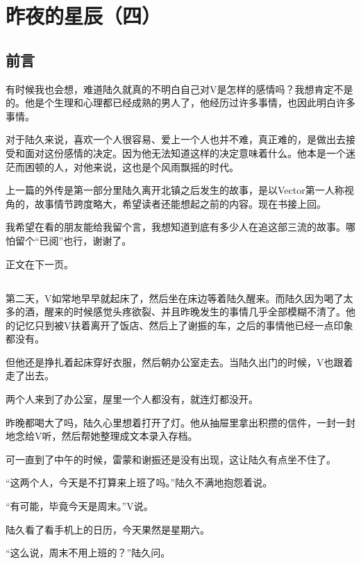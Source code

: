 \chapter{昨夜的星辰（四）}


\section*{前言}
有时候我也会想，难道陆久就真的不明白自己对V是怎样的感情吗？我想肯定不是的。他是个生理和心理都已经成熟的男人了，他经历过许多事情，也因此明白许多事情。

对于陆久来说，喜欢一个人很容易、爱上一个人也并不难，真正难的，是做出去接受和面对这份感情的决定。因为他无法知道这样的决定意味着什么。他本是一个迷茫而困顿的人，对他来说，这也是个风雨飘摇的时代。

\lineseparator

上一篇的外传是第一部分里陆久离开北镇之后发生的故事，是以Vector第一人称视角的，故事情节跨度略大，希望读者还能想起之前的内容。现在书接上回。

我希望在看的朋友能给我留个言，我想知道到底有多少人在追这部三流的故事。哪怕留个“已阅”也行，谢谢了。

正文在下一页。

\lineseparator

\section*{}

第二天，V如常地早早就起床了，然后坐在床边等着陆久醒来。而陆久因为喝了太多的酒，醒来的时候感觉头疼欲裂、并且昨晚发生的事情几乎全部模糊不清了。他的记忆只到被V扶着离开了饭店、然后上了谢振的车，之后的事情他已经一点印象都没有。

但他还是挣扎着起床穿好衣服，然后朝办公室走去。当陆久出门的时候，V也跟着走了出去。

两个人来到了办公室，屋里一个人都没有，就连灯都没开。

昨晚都喝大了吗，陆久心里想着打开了灯。他从抽屉里拿出积攒的信件，一封一封地念给V听，然后帮她整理成文本录入存档。

可一直到了中午的时候，雷蒙和谢振还是没有出现，这让陆久有点坐不住了。

“这两个人，今天是不打算来上班了吗。”陆久不满地抱怨着说。

“有可能，毕竟今天是周末。”V说。

陆久看了看手机上的日历，今天果然是星期六。

“这么说，周末不用上班的？”陆久问。

